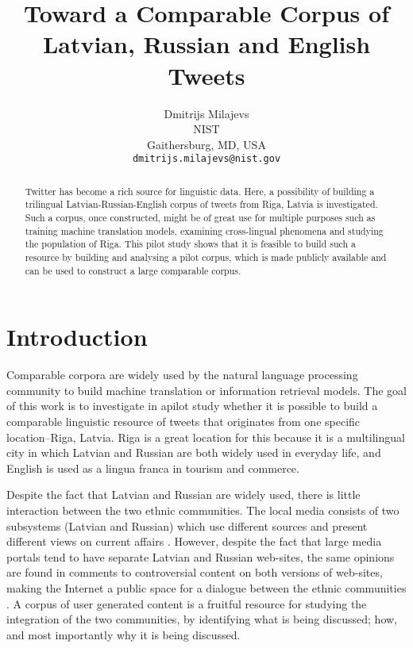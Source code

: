 \documentclass[11pt,a4paper]{article}
\title{Toward a Comparable Corpus of Latvian, Russian and English Tweets}
\author{Dmitrijs Milajevs \\
  NIST \\
  Gaithersburg, MD, USA \\
  {\tt dmitrijs.milajevs@nist.gov}}
\date{}
\begin{document}
\maketitle

\begin{abstract}
Twitter has become a rich source for linguistic data. Here, a possibility of building a trilingual Latvian-Russian-English corpus of tweets from Riga, Latvia is investigated. Such a corpus, once constructed, might be of great use for multiple purposes such as training machine translation models, examining cross-lingual phenomena and studying the population of Riga. This pilot study shows that it is feasible to build such a resource by building and analysing a pilot corpus, which is made publicly available and can be used to construct a large comparable corpus.
\end{abstract}

\section{Introduction}
\label{sec:introduction}

Comparable corpora are widely used by the natural language processing community to build machine translation or information retrieval models. The goal of this work is to investigate in  apilot study whether it is possible to build a comparable linguistic resource of tweets that originates from one specific location--Riga, Latvia. Riga is a great location for this because it is a multilingual city in which Latvian and Russian are both widely used in everyday life, and English is used as a lingua franca in tourism and commerce.

Despite the fact that Latvian and Russian are widely used, there is little interaction between the two ethnic communities. The local media consists of two subsystems (Latvian and Russian) which use different sources and present different views on current affairs \cite{muiznieks2010}. However, despite the fact that large media portals tend to have separate Latvian and Russian web-sites, the same opinions are found in comments to controversial content on both versions of web-sites, making the Internet a public space for a dialogue  between the ethnic communities \cite{sulmane2010}. A corpus of user generated content is a fruitful resource for studying the integration of the two communities, by identifying what is being discussed; how, and most importantly why it is being discussed.
\end{document}
